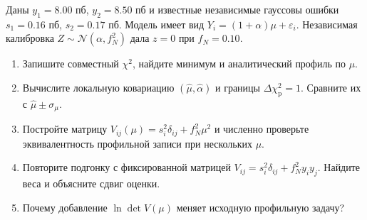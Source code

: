 \documentclass[
  russian,
  11pt,
  a4paper,
  open=any]{scrbook}
\providecommand{\tightlist}{%
  \setlength{\itemsep}{0pt}\setlength{\parskip}{0pt}}
\begin{document}
\begin{semanticpdfbox}[colback=BookCoralSoft,borderline west={1.2mm}{0pt}{BookCoral}]

\par\nopagebreak[4]\vspace{1.2mm}

Даны \(y_1=8.00\) пб, \(y_2=8.50\) пб и известные независимые гауссовы
ошибки \(s_1=0.16\) пб, \(s_2=0.17\) пб. Модель имеет вид
\(Y_i=(1+\alpha)\mu+\varepsilon_i\). Независимая калибровка
\(Z\sim\mathcal N(\alpha,f_N^2)\) дала \(z=0\) при \(f_N=0.10\).

\begin{enumerate}
\def\labelenumi{\arabic{enumi}.}
\tightlist
\item
  Запишите совместный \(\chi^2\), найдите минимум и аналитический
  профиль по \(\mu\).
\item
  Вычислите локальную ковариацию \((\widehat\mu,\widehat\alpha)\) и
  границы \(\Delta\chi^2_{\mathrm p}=1\). Сравните их с
  \(\widehat\mu\pm\sigma_\mu\).
\item
  Постройте матрицу \(V_{ij}(\mu)=s_i^2\delta_{ij}+f_N^2\mu^2\) и
  численно проверьте эквивалентность профильной записи при нескольких
  \(\mu\).
\item
  Повторите подгонку с фиксированной матрицей
  \(V_{ij}=s_i^2\delta_{ij}+f_N^2y_i y_j\). Найдите веса и объясните
  сдвиг оценки.
\item
  Почему добавление \(\ln\det V(\mu)\) меняет исходную профильную
  задачу?
\end{enumerate}

\end{semanticpdfbox}
\end{document}
